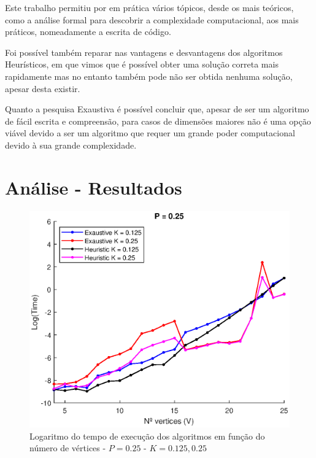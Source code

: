 \documentclass{revdetua}
\begin{document}
Este trabalho permitiu por em prática vários tópicos, desde os mais teóricos, como a análise formal para descobrir a complexidade computacional, aos mais práticos, nomeadamente a escrita de código.

Foi possível também reparar nas vantagens e desvantagens dos algoritmos Heurísticos, em que vimos que é possível obter uma solução correta mais rapidamente mas no entanto também pode não ser obtida nenhuma solução, apesar desta existir.

Quanto a pesquisa Exaustiva é possível concluir que, apesar de ser um algoritmo de fácil escrita e compreensão, para casos de dimensões maiores não é uma opção viável devido a ser um algoritmo que requer um grande poder computacional devido à sua grande complexidade.



\printbibliography



\clearpage
\appendix

\section{Análise - Resultados}
\label{APP_RES}


\begin{figure}[h!]
\centering
\includegraphics[scale = 0.5]{Figs/1_P025.eps}
\caption{Logaritmo do tempo de execução dos algoritmos em função do número de vértices - $P = 0.25$ - $K = 0.125, 0.25$}
\label{1_P025}
\end{figure}
\end{document}
